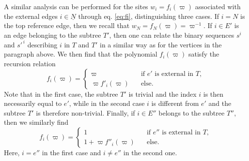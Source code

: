 \documentclass{article}
\begin{document}
A similar analysis can be performed for the sites $w_i=f_i(\varpi)$ associated with the external edges $i\in\underline{N}$ through eq. \eqref{eq:fi}, distinguishing three cases. If $i=N$ is the top reference edge, then we recall that $w_N=f_N(\varpi)=\varpi^{-1}$. If $i\in E'$ is an edge belonging to the subtree $T'$, then one can relate the binary sequences $s^{i}$ and $s'^{\,i}$ describing $i$ in $T$ and $T'$ in a similar way as for the vertices in the paragraph above. We then find that the polynomial $f_{i}(\varpi)$ satisfy the recursion relation
\begin{equation}\label{eq:w'}
f_{i}(\varpi) = \left\lbrace \begin{array}{ll}
\varpi & \text{ if } e' \text{ is external in } T, \\
\varpi f'_{i}(\varpi) \hspace{7pt} & \text{ else.} 
\end{array} \right. 
\end{equation}
Note that in the first case, the subtree $T'$ is trivial and the index $i$ is then necessarily equal to
$e'$, while in the second case $i$ is different from $e'$ and the subtree $T'$ is therefore non-trivial. Finally, if $i\in E''$ belongs to the subtree $T''$, then we similarly find
\begin{equation}\label{eq:w''}
f_{i}(\varpi) = \left\lbrace \begin{array}{ll}
1 & \text{ if } e'' \text{ is external in } T, \\
1 + \varpi f''_{i}(\varpi) \hspace{7pt} & \text{ else.} 
\end{array} \right. 
\end{equation}
Here, $i=e''$ in the first case and $i\neq e''$ in the second one.
\end{document}
